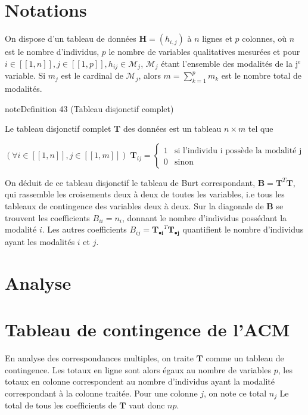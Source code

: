 \documentclass[letterpaper,10pt,french]{sphinxmanual}
\begin{document}
\section{Notations}
\label{\detokenize{acm:notations}}
\sphinxAtStartPar
On dispose d’un tableau de données \(\mathbf{H}=(h_{i,j})\) à \(n\) lignes et \(p\) colonnes, où \(n\) est le nombre d’individus, \(p\) le nombre de variables qualitatives mesurées et pour \(i\in[\![1,n]\!],j\in[\![1,p]\!],h_{ij}\in\mathcal{M}_j\), \(\mathcal{M}_j\) étant l’ensemble des modalités de la j\(^e\) variable. Si \(m_j\) est le cardinal de \(\mathcal{M}_j\), alors \(m=\sum_{k=1}^p m_k\) est le nombre total de modalités.

\ignorespaces \label{acm:definition-0}
\begin{sphinxadmonition}{note}{Definition 43 (Tableau disjonctif complet)}



\sphinxAtStartPar
Le tableau disjonctif complet \(\mathbf T\) des données est un tableau \(n\times m\) tel que

\sphinxAtStartPar
\((\forall i\in[\![1,n]\!],j\in[\![1, m]\!])\; \mathbf T_{ij} = \left \{ \begin{array}{cl} 1&\textrm{si l'individu i possède la modalité j}\\0 & \textrm{sinon}\end{array}\right .\)
\end{sphinxadmonition}

\ignorespaces 
{}\ignorespaces 
\sphinxAtStartPar
On déduit de ce tableau disjonctif le tableau de Burt correspondant, \(\mathbf B=\mathbf T^T \mathbf T\), qui rassemble les croisements deux à  deux de toutes les variables, i.e tous les tableaux de contingence des variables deux à deux. Sur la diagonale de \(\mathbf B\) se trouvent les coefficients \(B_{ii}=n_i\), donnant le nombre d’individus possédant la modalité \(i\).  Les autres coefficients \(B_{ij} = \mathbf{T_{\bullet i}}^T \mathbf {T_{\bullet j}}\) quantifient le nombre d’individus ayant les modalités \(i\) et \(j\).


\section{Analyse}
\label{\detokenize{acm:analyse}}

\section{Tableau de contingence de l’ACM}
\label{\detokenize{acm:tableau-de-contingence-de-l-acm}}
\sphinxAtStartPar
En analyse des correspondances multiples, on traite \(\mathbf T\) comme un tableau de contingence. Les totaux en ligne sont alors égaux au nombre de variables \(p\), les totaux en colonne correspondent au nombre d’individus ayant la modalité correspondant à la colonne traitée. Pour une colonne \(j\), on note ce total \(n_j\) Le total de tous les coefficients de \(\mathbf T\) vaut donc \(np\).
\end{document}
